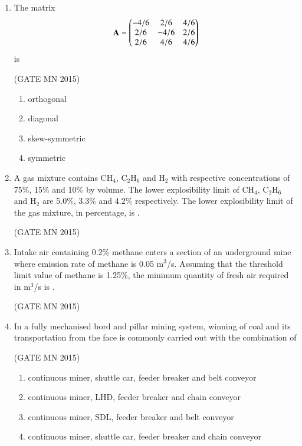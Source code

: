 \documentclass[journal]{IEEEtran}
\begin{document}
\begin{enumerate}
\item The matrix  
\[
	\mathbf{A}=\begin{pmatrix}
-4/6 & 2/6 & 4/6 \\
2/6 & -4/6 & 2/6 \\
2/6 & 4/6 & 4/6
\end{pmatrix}
\]
is  

\hfill(GATE MN 2015)
\begin{multicols}{4}
\begin{enumerate}
\item orthogonal  
\item diagonal  
\item skew-symmetric  
\item symmetric  
\end{enumerate}
\end{multicols}

\item A gas mixture contains CH$_4$, C$_2$H$_6$ and H$_2$ with respective concentrations of 75\%, 15\% and 10\% by volume. The lower explosibility limit of CH$_4$, C$_2$H$_6$ and H$_2$ are 5.0\%, 3.3\% and 4.2\% respectively.  
The lower explosibility limit of the gas mixture, in percentage, is \underline{\hspace{2cm}}.  

\hfill(GATE MN 2015)


\item Intake air containing 0.2\% methane enters a section of an underground mine where emission rate of methane is 0.05 m$^3$/s. Assuming that the threshold limit value of methane is 1.25\%, the minimum quantity of fresh air required in m$^3$/s is \underline{\hspace{2cm}}.  

	\hfill(GATE MN 2015)

\item In a fully mechanised bord and pillar mining system, winning of coal and its transportation from the face is commonly carried out with the combination of  

	\hfill(GATE MN 2015)

\begin{enumerate}
\item continuous miner, shuttle car, feeder breaker and belt conveyor  
\item continuous miner, LHD, feeder breaker and chain conveyor  
\item continuous miner, SDL, feeder breaker and belt conveyor  
\item continuous miner, shuttle car, feeder breaker and chain conveyor  
\end{enumerate}



\end{enumerate}
\end{document}
